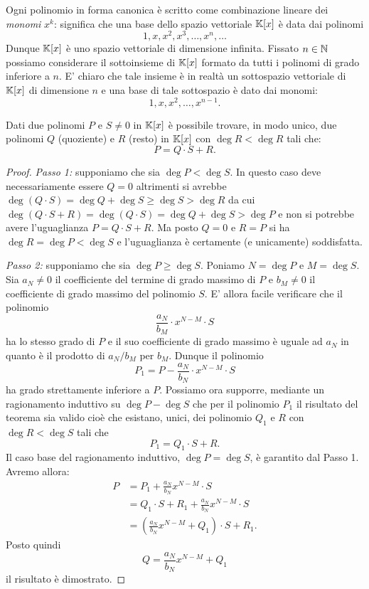 Ogni polinomio in forma canonica è scritto come
combinazione lineare dei \emph{monomi} $x^k$:
significa che una base dello spazio vettoriale $\mathbb K[x]$ è data dai
polinomi
\[
  1, x, x^2, x^3, \dots, x^n, \dots
\]
Dunque $\mathbb K[x]$ è uno spazio vettoriale di dimensione
infinita. Fissato $n\in \mathbb N$ possiamo considerare
il sottoinsieme di $\mathbb K[x]$ formato da tutti
i polinomi di grado inferiore a $n$. E' chiaro
che tale insieme è in realtà un sottospazio vettoriale
di $\mathbb K[x]$ di dimensione $n$ e una base di tale
sottospazio è dato dai monomi:
\[
  1, x, x^2, \dots, x^{n-1}.
\]

\begin{theorem}
\label{th:divisione_polinomi}%
%
%
%
%
%
Dati due polinomi $P$ e $S\neq 0$ in $\mathbb K[x]$ è possibile
trovare, in modo unico, due polinomi $Q$ (quoziente)
e $R$ (resto) in $\mathbb K[x]$ con $\deg R < \deg R$
tali che:
\[
  P = Q \cdot S + R.
\]
\end{theorem}
%
\begin{proof}
\emph{Passo 1:} supponiamo che sia $\deg P < \deg S$.
In questo caso deve necessariamente essere $Q=0$ altrimenti
si avrebbe $\deg (Q\cdot S) = \deg Q + \deg S \ge \deg S > \deg R$ da cui
$\deg (Q\cdot S + R) = \deg(Q\cdot S) = \deg Q + \deg S > \deg P$
e non si potrebbe avere l'uguaglianza $P = Q\cdot S + R$.
Ma posto $Q=0$ e $R=P$ si ha $\deg R = \deg P < \deg S$
e l'uguaglianza è certamente (e unicamente) soddisfatta.

\emph{Passo 2:} supponiamo che sia $\deg P \ge \deg S$.
Poniamo $N=\deg P$ e $M=\deg S$.
Sia $a_N\neq 0$ il coefficiente del termine di grado massimo
di $P$ e $b_M\neq 0$ il coefficiente di grado massimo
del polinomio $S$.
E' allora facile verificare che il polinomio
\[
\frac{a_N}{b_M} \cdot x^{N-M}\cdot S
\]
ha lo stesso grado di $P$ e il suo coefficiente di grado
massimo è uguale ad $a_N$ in quanto è il prodotto di
$a_N/b_M$ per $b_M$.
Dunque il polinomio
\[
 P_1 = P - \frac{a_N}{b_N} \cdot x^{N-M}\cdot S
\]
ha grado strettamente inferiore a $P$.
Possiamo ora supporre, mediante un ragionamento induttivo
su $\deg P - \deg S$
che per il polinomio $P_1$ il risultato del teorema sia
valido cioè
che esistano, unici, dei polinomio $Q_1$ e $R$
con $\deg R < \deg S$ tali che
\[
  P_1 = Q_1 \cdot S + R.
\]
Il caso base del ragionamento induttivo,
$\deg P = \deg S$, è garantito dal Passo 1.
Avremo allora:
\begin{align*}
  P &= P_1 + \frac{a_N}{b_N} x^{N-M}\cdot S\\
    &= Q_1 \cdot S + R_1 + \frac{a_N}{b_N} x^{N-M}\cdot S\\
    &= (\frac{a_N}{b_N} x^{N-M} + Q_1) \cdot S + R_1.
\end{align*}
Posto quindi
\[
 Q = \frac{a_N}{b_N} x^{N-M} + Q_1
\]
il risultato è dimostrato.
\end{proof}


